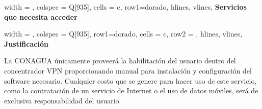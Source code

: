 \documentclass[letterpaper,9pt]{article}
\begin{document}
\vspace{-25pt}
\begin{longtblr}[
	label = none,
	entry = none,
	]{
                    	width = \linewidth,
		colspec = {Q[935]},
		cells = {c},
                     row{1}={dorado},
		hlines,
		vlines,
	}
	\textbf{Servicios que necesita acceder} \\\SERVICIOS  
\end{longtblr}

\vspace{-25pt}
\begin{longtblr}[
	label = none,
	entry = none,
	]{
		width = \linewidth,
		colspec = {Q[935]},
                     row{1}={dorado},
		cells = {c},
		row{2} = {},
		hlines,
		vlines,
	}
	\textbf{Justificación} \\\JUSTIFICACION
\end{longtblr}
\clearpage

La CONAGUA únicamente proveerá la habilitación del usuario dentro del concentrador VPN  proporcionando manual  para instalación y configuración del software necesario. Cualquier costo que se genere para hacer uso de este servicio, como la contratación de un servicio de Internet  o el uso de datos móviles, será de exclusiva responsabilidad del usuario.
\end{document}
